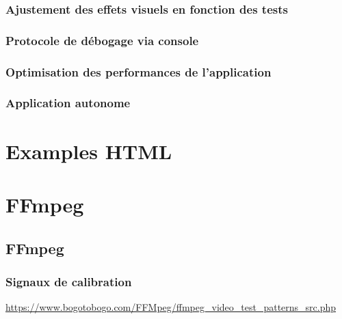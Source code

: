 \documentclass[
  french,
]{book}
\begin{document}
\hypertarget{ajustement-des-effets-visuels-en-fonction-des-tests}{%
\subsection{Ajustement des effets visuels en fonction des tests}\label{ajustement-des-effets-visuels-en-fonction-des-tests}}

\hypertarget{protocole-de-duxe9bogage-via-console}{%
\subsection{Protocole de débogage via console}\label{protocole-de-duxe9bogage-via-console}}

\hypertarget{optimisation-des-performances-de-lapplication}{%
\subsection{Optimisation des performances de l'application}\label{optimisation-des-performances-de-lapplication}}

\hypertarget{application-autonome}{%
\subsection{Application autonome}\label{application-autonome}}

\hypertarget{examples-html}{%
\chapter{Examples HTML}\label{examples-html}}

\hypertarget{ffmpeg}{%
\chapter{FFmpeg}\label{ffmpeg}}

\hypertarget{ffmpeg-1}{%
\section{FFmpeg}\label{ffmpeg-1}}

\hypertarget{signaux-de-calibration}{%
\subsection{Signaux de calibration}\label{signaux-de-calibration}}

\url{https://www.bogotobogo.com/FFMpeg/ffmpeg_video_test_patterns_src.php}
\end{document}
